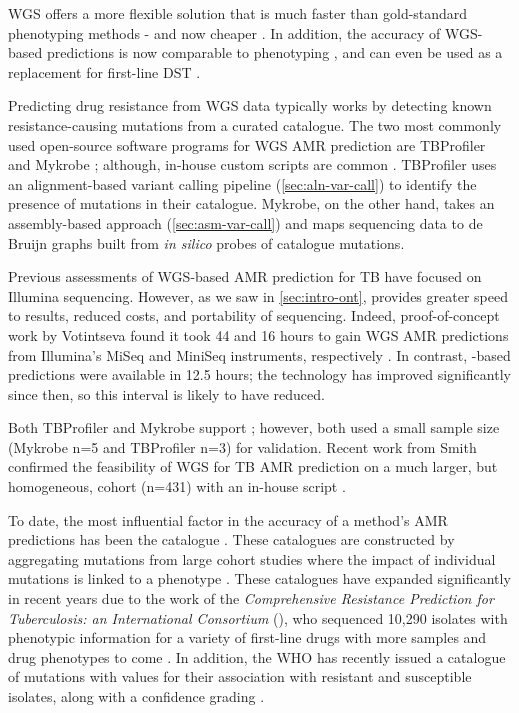 \noindent
WGS offers a more flexible solution that is much faster than gold-standard phenotyping methods - and now cheaper \cite{Pankhurst2016,Votintseva2015,Votintseva2017}. In addition, the accuracy of WGS-based predictions is now comparable to phenotyping \cite{hunt2019,walker2015,bradley2015,Pankhurst2016,Votintseva2015}, and can even be used as a replacement for first-line DST \cite{cryptic2018}. 

Predicting drug resistance from WGS data typically works by detecting known resistance-causing mutations from a curated catalogue. The two most commonly used open-source software programs for WGS AMR prediction are TBProfiler \cite{coll2015,phelan2019} and Mykrobe \cite{bradley2015,hunt2019}; although, in-house custom scripts are common \cite{smith2020,cryptic2018}. TBProfiler uses an alignment-based variant calling pipeline (\autoref{sec:aln-var-call}) to identify the presence of mutations in their catalogue. Mykrobe, on the other hand, takes an assembly-based approach (\autoref{sec:asm-var-call}) and maps sequencing data to de Bruijn graphs built from \textit{in silico} probes of catalogue mutations. 

Previous assessments of WGS-based AMR prediction for TB have focused on Illumina sequencing. However, as we saw in \autoref{sec:intro-ont}, \ont{} provides greater speed to results, reduced costs, and portability of sequencing. Indeed, proof-of-concept work by Votintseva \etal{} found it took 44 and 16 hours to gain WGS AMR predictions from Illumina's MiSeq and MiniSeq instruments, respectively \cite{Votintseva2017}. In contrast, \ont{}-based predictions were available in 12.5 hours; the technology has improved significantly since then, so this interval is likely to have reduced.

Both TBProfiler and Mykrobe support \ont{}; however, both used a small sample size (Mykrobe n=5 and TBProfiler n=3) for validation. Recent work from Smith \etal{} confirmed the feasibility of \ont{} WGS for TB AMR prediction on a much larger, but homogeneous, cohort (n=431) with an in-house script \cite{smith2020}.

To date, the most influential factor in the accuracy of a method's AMR predictions has been the catalogue \cite{hunt2019}. These catalogues are constructed by aggregating mutations from large cohort studies where the impact of individual mutations is linked to a phenotype \cite{hunt2019,miotto2017,phelan2019}. These catalogues have expanded significantly in recent years due to the work of the \emph{Comprehensive Resistance Prediction for Tuberculosis: an International Consortium} (\cryptic{}), who sequenced 10,290 isolates with phenotypic information for a variety of first-line drugs \cite{cryptic2018,cryptic2021data} with more samples and drug phenotypes to come \cite{Votintseva2015}. In addition, the WHO has recently issued a catalogue of mutations with values for their association with resistant and susceptible isolates, along with a confidence grading \cite{whopanel2021}.

